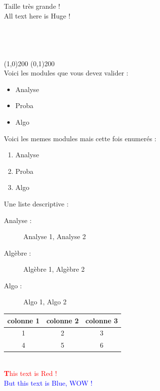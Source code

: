 \documentclass{article} %
\newcommand{\be}{\begin{enumerate}} %
\begin{document}
{\Huge Taille très grande !
\\All text here is Huge !
}
\\
\vspace{2cm}
\\
\vspace{1cm}
\\
\vspace{1cm}
\\
\vspace{1cm}
\\
{\center
\line(1,0){200} %
\line(0,1){200}
}
\\
Voici les modules que vous devez valider :
\begin{itemize}
\item Analyse
\item Proba
\item Algo
\end{itemize}
Voici les memes modules mais cette fois enumerés :
\begin{enumerate}
\item Analyse
\item Proba
\item Algo
\end{enumerate}
Une liste descriptive :
\begin{description}
\item[Analyse : ] Analyse 1, Analyse 2
\item[Algèbre : ] Algèbre 1, Algèbre 2
\item[Algo : ] Algo 1, Algo 2
\end{description}
\begin{tabular}{|c||c|c|} %
\hline
colonne 1 & colonne 2 & colonne 3 
\\
\hline
1 & 2 & 3
\\
\hline
4 & 5 & 6
\\
\hline
\end{tabular}
\\
\vspace{1cm}
\textcolor{red}{\textbf This text is Red !}
\textcolor{blue}{\\ But this text is Blue, WOW !}
\end{document}
